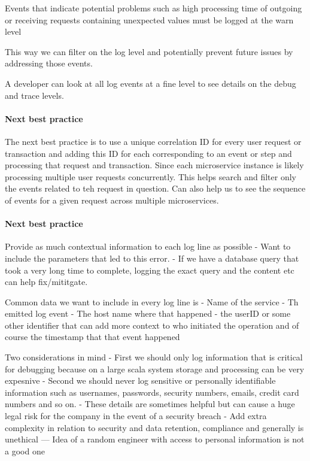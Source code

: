 \documentclass[a4paper, 11pt]{book}
\begin{document}
    Events that indicate potential problems such as high processing time of outgoing or receiving requests containing unexpected values must be logged at the warn level

    This way we can filter on the log level and potentially prevent future issues by addressing those events.

    A developer can look at all log events at a fine level to see details on the debug and trace levels.

    \paragraph{Next best practice}
    The next best practice is to use a unique correlation ID for every user request or transaction and adding this ID for each corresponding to an event or step and processing that request and transaction.
    Since each microservice instance is likely processing multiple user requests concurrently.
    This helps search and filter only the events related to teh request in question.
    Can also help us to see the sequence of events for a given request across multiple microservices.

    \paragraph{Next best practice}
    Provide as much contextual information to each log line as possible
    - Want to include the parameters that led to this error.
    - If we have a database query that took a very long time to complete, logging the exact query and the content etc can help fix/mititgate.

    Common data we want to include in every log line is
    - Name of the service
    - Th emitted log event
    - The host name where that happened
    - the userID or some other identifier that can add more context to who initiated the operation and of course the timestamp that that event happened

    Two considerations in mind
    - First we should only log information that is critical for debugging because on a large scala system storage and processing can be very expesnive
    - Second we should never log sensitive or personally identifiable information such as usernames, passwords, security numbers, emails, credit card numbers and so on.
    - These details are sometimes helpful but can cause a huge legal risk for the company in the event of a security breach
    - Add extra complexity in relation to security and data retention, compliance and generally is unethical
    --- Idea of a random engineer with access to personal information is not a good one
\end{document}
